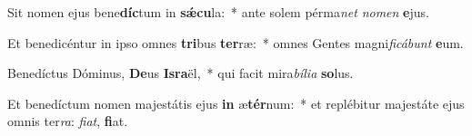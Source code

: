 \item Sit nomen ejus bene\textbf{díc}tum in \textbf{sǽ}\textbf{cu}la:~* ante solem pérma\textit{net} \textit{no}\textit{men} \textbf{e}jus.
\item Et benedicéntur in ipso omnes \textbf{tri}bus \textbf{ter}ræ:~* omnes Gentes magni\textit{fi}\textit{cá}\textit{bunt} \textbf{e}um.
\item Benedíctus Dóminus, \textbf{De}us \textbf{Is}\textbf{ra}ël,~* qui facit mira\textit{bí}\textit{li}\textit{a} \textbf{so}lus.
\item Et benedíctum nomen majestátis ejus \textbf{in} æ\textbf{tér}num:~* et replébitur majestáte ejus omnis ter\textit{ra}: \textit{fi}\textit{at}, \textbf{fi}at.

